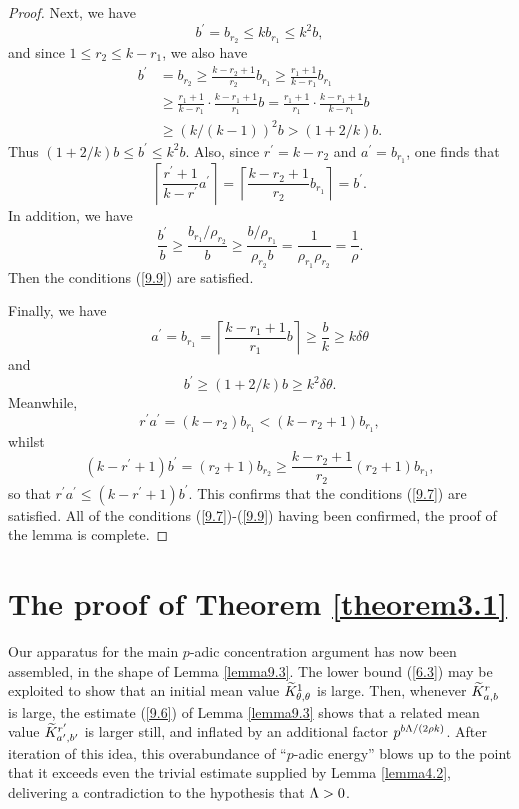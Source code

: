 \documentclass[12pt,reqno]{amsart}
\theoremstyle{definition}
\theoremstyle{remark}
\numberwithin{equation}{section}
\def\del{{\delta}} \def\Del{{\Delta}} \def\Deltil{{\widetilde \Delta}}
\def\tet{{\theta}} \def\bftet{{\boldsymbol \theta}}
\def\le{\leqslant} \def\ge{\geqslant} \def\pleq{\preccurlyeq} \def\ple{\prec}
\begin{document}
\begin{proof}
Next, we have
$$b^\prime=b_{r_2}\le kb_{r_1}\le k^2b,$$
and since $1\le r_2\le k-r_1$, we also have
\begin{align*}
b^\prime &=b_{r_2}\ge \frac{k-r_2+1}{r_2}b_{r_1}\ge \frac{r_1+1}{k-r_1}b_{r_1}\\
&\ge \frac{r_1+1}{k-r_1}\cdot \frac{k-r_1+1}{r_1}b=\frac{r_1+1}{r_1}\cdot 
\frac{k-r_1+1}{k-r_1}b\\
&\ge (k/(k-1))^2b>(1+2/k)b.
\end{align*}
Thus $(1+2/k)b\le b^\prime \le k^2b$. Also, since $r^\prime =k-r_2$ and 
$a^\prime =b_{r_1}$, one finds that
$$\left\lceil \frac{r^\prime+1}{k-r^\prime}a^\prime \right\rceil =\left\lceil 
\frac{k-r_2+1}{r_2}b_{r_1}\right\rceil =b^\prime .$$
In addition, we have
$$\frac{b^\prime}{b}\ge \frac{b_{r_1}/\rho_{r_2}}{b}\ge 
\frac{b/\rho_{r_1}}{\rho_{r_2}b}=\frac{1}{\rho_{r_1}\rho_{r_2}}=\frac{1}{\rho}.$$
Then the conditions (\ref{9.9}) are satisfied.\par

Finally, we have
$$a^\prime =b_{r_1}=\left\lceil \frac{k-r_1+1}{r_1}b\right\rceil \ge \frac{b}{k}
\ge k\del \tet$$
and
$$b^\prime \ge (1+2/k)b\ge k^2\del \tet.$$
Meanwhile,
$$r^\prime a^\prime =(k-r_2)b_{r_1}<(k-r_2+1)b_{r_1},$$
whilst
$$(k-r^\prime +1)b^\prime =(r_2+1)b_{r_2}\ge \frac{k-r_2+1}{r_2}(r_2+1)b_{r_1},$$
so that $r^\prime a^\prime \le (k-r^\prime+1)b^\prime$. This confirms that the conditions 
(\ref{9.7}) are satisfied. All of the conditions (\ref{9.7})-(\ref{9.9}) having been 
confirmed, the proof of the lemma is complete.
\end{proof}

\section{The proof of Theorem \ref{theorem3.1}} Our apparatus for the main $p$-adic 
concentration argument has now been assembled, in the shape of Lemma \ref{lemma9.3}. 
The lower bound (\ref{6.3}) may be exploited to show that an initial mean value 
$\Ktil_{\tet,\tet}^1$ is large. Then, whenever $\widetilde K_{a,b}^r$ is large, the estimate 
(\ref{9.6}) of Lemma \ref{lemma9.3} shows that a related mean value 
$\widetilde K_{a^\prime,b^\prime}^{r^\prime}$ is larger still, and inflated by an additional factor 
$p^{b{\Lambda}/(2\rho k)}$. After iteration of this idea, this overabundance of ``$p$-adic 
energy'' blows up to the point that it exceeds even the trivial estimate supplied by Lemma 
\ref{lemma4.2}, delivering a contradiction to the hypothesis that ${\Lambda}>0$.
\end{document}

